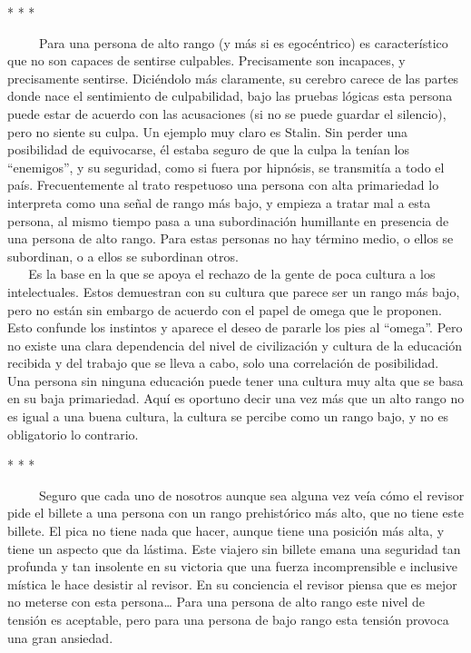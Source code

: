 \begin{center}
 *  *  * 
\end{center}

~ ~ ~ Para una persona de alto rango (y más si es egocéntrico) es
característico que no son capaces de sentirse culpables. Precisamente
son incapaces, y precisamente sentirse. Diciéndolo más claramente, su
cerebro carece de las partes donde nace el sentimiento de culpabilidad,
bajo las pruebas lógicas esta persona puede estar de acuerdo con las
acusaciones (si no se puede guardar el silencio), pero no siente su
culpa. Un ejemplo muy claro es Stalin. Sin perder una posibilidad de
equivocarse, él estaba seguro de que la culpa la tenían los
``enemigos'', y su seguridad, como si fuera por hipnósis, se transmitía
a todo el país. Frecuentemente al trato respetuoso una persona con alta
primariedad lo interpreta como una señal de rango más bajo, y empieza a
tratar mal a esta persona, al mismo tiempo pasa a una subordinación
humillante en presencia de una persona de alto rango. Para estas
personas no hay término medio, o ellos se subordinan, o a ellos se
subordinan otros.\\
\hspace*{0.333em} ~ ~ Es la base en la que se apoya el rechazo de la
gente de poca cultura a los intelectuales. Estos demuestran con su
cultura que parece ser un rango más bajo, pero no están sin embargo de
acuerdo con el papel de omega que le proponen. Esto confunde los
instintos y aparece el deseo de pararle los pies al ``omega''. Pero no
existe una clara dependencia del nivel de civilización y cultura de la
educación recibida y del trabajo que se lleva a cabo, solo una
correlación de posibilidad. Una persona sin ninguna educación puede
tener una cultura muy alta que se basa en su baja primariedad. Aquí es
oportuno decir una vez más que un alto rango no es igual a una buena
cultura, la cultura se percibe como un rango bajo, y no es obligatorio
lo contrario.

\begin{center}
 *  *  * 
\end{center}

~ ~ ~ Seguro que cada uno de nosotros aunque sea alguna vez veía cómo el
revisor pide el billete a una persona con un rango prehistórico más
alto, que no tiene este billete. El pica no tiene nada que hacer, aunque
tiene una posición más alta, y tiene un aspecto que da lástima. Este
viajero sin billete emana una seguridad tan profunda y tan insolente en
su victoria que una fuerza incomprensible e inclusive mística le hace
desistir al revisor. En su conciencia el revisor piensa que es mejor no
meterse con esta persona\ldots{} Para una persona de alto rango este
nivel de tensión es aceptable, pero para una persona de bajo rango esta
tensión provoca una gran ansiedad.

